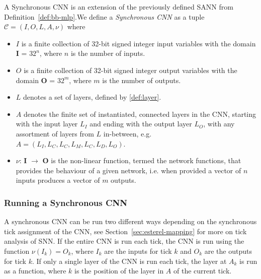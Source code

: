 \begin{definition}
	\label{def:cnn}
	A Synchronous \ac{CNN} is an extension of the previously defined \ac{SANN} from Definition~\ref{def:bb-mlp}.We define a \emph{Synchronous \ac{CNN}} as a tuple $\mathcal{C} = (I, O, L, A, \nu)$ where
	\begin{itemize}
		\item $I$ is a finite collection of 32-bit signed integer input variables with the domain \textbf{I} = $32^n$, where $n$ is the number of inputs.
		\item $O$ is a finite collection of 32-bit signed integer output variables with the domain \textbf{O} = $32^m$, where $m$ is the number of outputs.
		\item $L$ denotes a set of layers, defined by \ref{def:layer}.
		\item $A$ denotes the finite set of instantiated, connected layers in the \ac{CNN}, starting with the input layer $L_I$ and ending with the output layer $L_O$, with any assortment of layers from $L$ in-between, e.g. $A = (L_I, L_C, L_C, L_M, L_C, L_D, L_O)$.
		\item $\nu$: \textbf{I} $\rightarrow$ \textbf{O} is the non-linear function, termed the network functions, that provides the behaviour of a given network, i.e. when provided a vector of $n$ inputs produces a vector of $m$ outputs. 
	\end{itemize}
\end{definition}

\subsubsection{Running a Synchronous CNN}
A synchronous CNN can be run two different ways depending on the synchronous tick assignment of the CNN, see Section~\ref{sec:esterel-mapping} for more on tick analysis of \ac{SNN}. 
If the entire CNN is run each tick, the CNN is run using the function $\nu(I_k) = O_k$, where $I_k$ are the inputs for tick $k$ and $O_k$ are the outputs for tick $k$.
If only a single layer of the CNN is run each tick, the layer at $A_k$ is run as a function, where $k$ is the position of the layer in $A$ of the current tick.
















